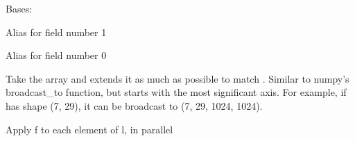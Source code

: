 \documentclass[letterpaper,10pt,english]{sphinxmanual}
\begin{document}
\begin{fulllineitems}
\label{\detokenize{xanespy:xanespy.utilities.Pixel}}
Bases: 

\begin{fulllineitems}
\label{\detokenize{xanespy:xanespy.utilities.Pixel.horizontal}}
Alias for field number 1

\end{fulllineitems}


\begin{fulllineitems}
\label{\detokenize{xanespy:xanespy.utilities.Pixel.vertical}}
Alias for field number 0

\end{fulllineitems}


\end{fulllineitems}


\begin{fulllineitems}
\label{\detokenize{xanespy:xanespy.utilities.broadcast_reverse}}
Take the array and extends it as much as possible to match
. Similar to numpy’s broadcast\_to function, but starts with
the most significant axis. For example, if  has shape (7,
29), it can be broadcast to (7, 29, 1024, 1024).

\end{fulllineitems}


\begin{fulllineitems}
\label{\detokenize{xanespy:xanespy.utilities.foreach}}
Apply f to each element of l, in parallel

\end{fulllineitems}
\end{document}

